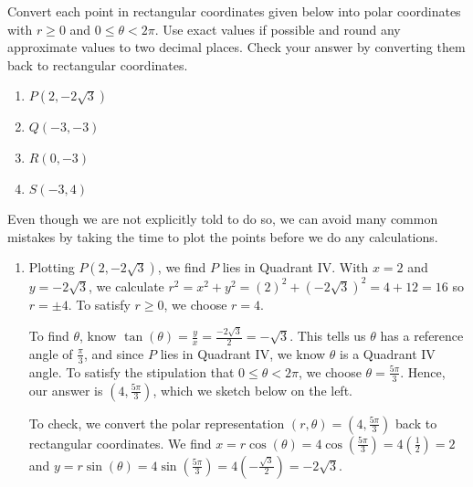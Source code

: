 \documentclass{ximera}
\begin{document}
\begin{example}  \label{pointconversionex}   Convert each point in rectangular coordinates given below into polar coordinates with $r \geq 0$ and $0 \leq \theta < 2\pi$.  Use exact values if possible and round any approximate values to two decimal places.  Check your answer by converting them back to rectangular coordinates.
\begin{enumerate}

\item  $P\left(2,-2\sqrt{3}\right)$

\item  $Q(-3,-3)$

\item  $R(0,-3)$

\item  $S(-3,4)$

\end{enumerate}

\begin{explanation}

Even though we are not explicitly told to do so, we can avoid many common mistakes by taking the time to plot the points before we do any calculations. 


\begin{enumerate}

\item  Plotting $P\left(2,-2\sqrt{3}\right)$, we find $P$ lies in Quadrant IV. With $x = 2$ and $y = -2\sqrt{3}$, we calculate $r^2 = x^2 + y^2 = (2)^2 + \left(-2\sqrt{3}\right)^2 = 4+12 = 16$ so $r = \pm 4$.  To satisfy $r \geq 0$, we choose $r = 4$.  

 

To find $\theta$, know $\tan(\theta) = \frac{y}{x} = \frac{-2\sqrt{3}}{2} = -\sqrt{3}$.  This tells us $\theta$ has a reference angle of $\frac{\pi}{3}$, and  since $P$ lies in Quadrant IV, we know $\theta$ is a Quadrant IV angle.   To satisfy the stipulation that $0 \leq \theta < 2\pi$, we choose $\theta = \frac{5\pi}{3}$.  Hence, our answer is  $\left(4, \frac{5\pi}{3}\right)$, which we sketch below on the left.  


To check, we convert  the polar representation $(r,\theta) = \left(4, \frac{5\pi}{3}\right)$ back to rectangular coordinates.   We find $x = r \cos(\theta) = 4 \cos\left(\frac{5\pi}{3}\right) = 4 \left(\frac{1}{2}\right) =  2$ and  $y = r \sin(\theta) = 4 \sin\left(\frac{5\pi}{3}\right) = 4 \left(-\frac{\sqrt{3}}{2}\right) = -2\sqrt{3}$.

 



\end{enumerate}
\end{explanation}
\end{example}
\end{document}
